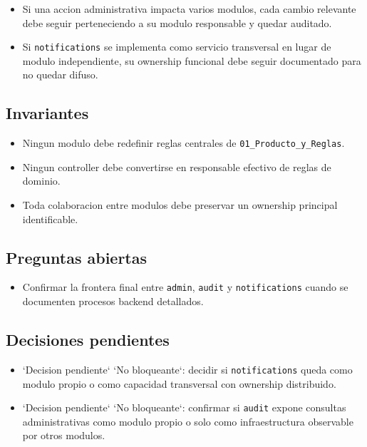 \begin{itemize}
  \item Si una accion administrativa impacta varios modulos, cada cambio relevante debe seguir perteneciendo a su modulo responsable y quedar auditado.
  \item Si \texttt{notifications} se implementa como servicio transversal en lugar de modulo independiente, su ownership funcional debe seguir documentado para no quedar difuso.
\end{itemize}

\subsection{Invariantes}

\begin{itemize}
  \item Ningun modulo debe redefinir reglas centrales de \texttt{01\_Producto\_y\_Reglas}.
  \item Ningun controller debe convertirse en responsable efectivo de reglas de dominio.
  \item Toda colaboracion entre modulos debe preservar un ownership principal identificable.
\end{itemize}

\subsection{Preguntas abiertas}

\begin{itemize}
  \item Confirmar la frontera final entre \texttt{admin}, \texttt{audit} y \texttt{notifications} cuando se documenten procesos backend detallados.
\end{itemize}

\subsection{Decisiones pendientes}

\begin{itemize}
  \item `Decision pendiente` `No bloqueante`: decidir si \texttt{notifications} queda como modulo propio o como capacidad transversal con ownership distribuido.
  \item `Decision pendiente` `No bloqueante`: confirmar si \texttt{audit} expone consultas administrativas como modulo propio o solo como infraestructura observable por otros modulos.
\end{itemize}

